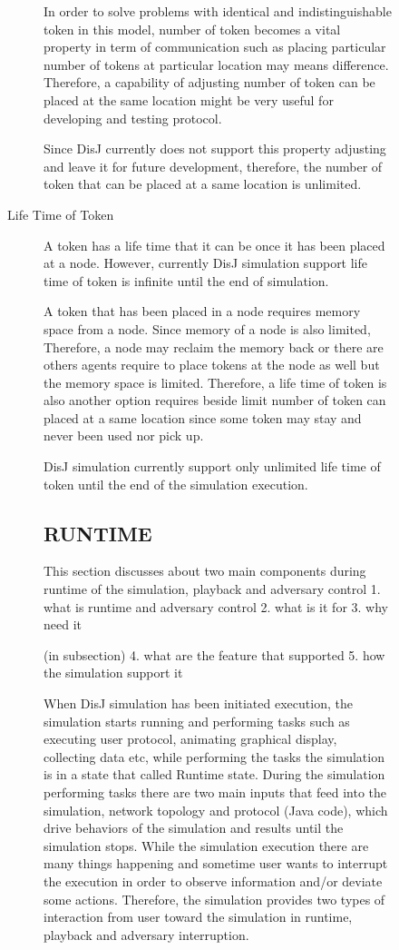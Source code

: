 \begin{description}
\begin{description}
\begin{description}
In order to solve problems with identical and indistinguishable token in this model, number of token becomes a vital property in term of communication such as placing particular number of tokens at particular location may means difference. Therefore, a capability of adjusting number of token can be placed at the same location might be very useful for developing and testing protocol.

Since DisJ currently does not support this property adjusting and leave it for future development, therefore, the number of token that can be placed at a same location is unlimited.

\item[Life Time of Token]
A token has a life time that it can be once it has been placed at a node. However, currently DisJ simulation support life time of token is infinite until the end of simulation.

A token that has been placed in a node requires memory space from a node. Since memory of a node is also limited, Therefore, a node may reclaim the memory back or there are others agents require to place tokens at the node as well but the memory space is limited. Therefore, a life time of token is also another option requires beside limit number of token can placed at a same location since some token may stay and never been used nor pick up.

DisJ simulation currently support only unlimited life time of token until the end of the simulation execution.




\subsection{RUNTIME}
This section discusses about two main components during runtime of the simulation, playback and adversary control
1. what is runtime and adversary control
2. what is it for
3. why need it

(in subsection)
4. what are the feature that supported
5. how the simulation support it

When DisJ simulation has been initiated execution, the simulation starts running and performing tasks such as executing user protocol, animating graphical display, collecting data etc, while performing the tasks the simulation is in a state that called Runtime state. During the simulation performing tasks there are two main inputs that feed into the simulation, network topology and protocol (Java code), which drive behaviors of the simulation and results until the simulation stops. While the simulation execution there are many things happening and sometime user wants to interrupt the execution in order to observe information and/or deviate some actions. Therefore, the simulation provides two types of interaction from user toward the simulation in runtime, playback and adversary interruption.


\end{description}
\end{description}
\end{description}
